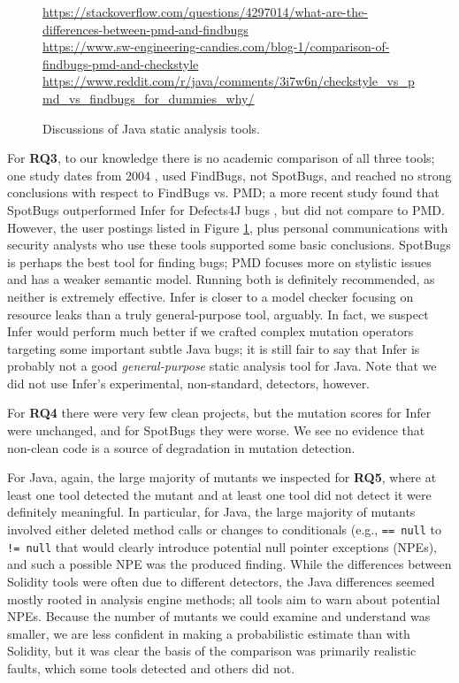 \begin{figure}
  {\scriptsize
    \raggedright    
  \url{https://stackoverflow.com/questions/4297014/what-are-the-differences-between-pmd-and-findbugs} \\
  \url{https://www.sw-engineering-candies.com/blog-1/comparison-of-findbugs-pmd-and-checkstyle} \\
  \url{https://www.reddit.com/r/java/comments/3i7w6n/checkstyle_vs_pmd_vs_findbugs_for_dummies_why/} \\
  }
\caption{Discussions of Java static analysis tools.}
\label{fig:blog}
\end{figure}

For {\bf RQ3}, to our knowledge there is no academic comparison of all three tools; one study dates from 2004 \cite{CompareJavaTools}, used FindBugs, not SpotBugs, and reached no strong conclusions with respect to FindBugs vs. PMD; a more recent study found that SpotBugs outperformed Infer for Defects4J \cite{just2014defects4j} bugs \cite{AllBugs}, but did not compare to PMD.  However, the user postings listed in Figure \ref{fig:blog}, plus personal communications with security analysts who use these tools \cite{personalJava} supported some basic conclusions.  SpotBugs is perhaps the best tool for finding bugs; PMD focuses more on stylistic issues and has a weaker semantic model.  Running both is definitely recommended, as neither is extremely effective.  Infer is closer to a model checker focusing on resource leaks than a truly general-purpose tool, arguably.  In fact, we suspect Infer would perform much better if we crafted complex mutation operators targeting some important subtle Java bugs; it is still fair to say that Infer is probably not a good \emph{general-purpose} static analysis tool for Java.  Note that we did not use Infer's experimental, non-standard, detectors, however.

For {\bf RQ4} there were very few clean projects, but the mutation scores for Infer were unchanged, and for SpotBugs they were worse.  We see no evidence that non-clean code is a source of degradation in mutation detection.


For Java, again, the large majority of mutants we inspected for {\bf RQ5}, where at least one tool detected the mutant and at least one tool did not detect it were definitely meaningful.  In particular, for Java, the large majority of mutants involved either deleted method calls or changes to conditionals (e.g., {\tt == null} to {\tt != null} that would clearly introduce potential null pointer exceptions (NPEs), and such a possible NPE was the produced finding.  While the differences between Solidity tools were often due to different detectors, the Java differences seemed mostly rooted in analysis engine methods; all tools aim to warn about potential NPEs.  Because the number of mutants we could examine and understand was smaller, we are less confident in making a probabilistic estimate than with Solidity, but it was clear the basis of the comparison was primarily realistic faults, which some tools detected and others did not.


